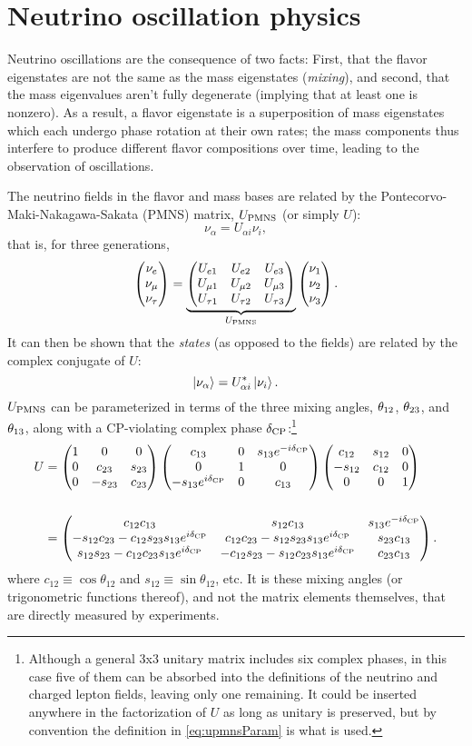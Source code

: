 \documentclass[../thesis.tex]{subfiles}
\begin{document}
\section{Neutrino oscillation physics}
\label{sec:oscPhysics}

Neutrino oscillations are the consequence of two facts: First, that the flavor eigenstates are not the same as the mass eigenstates (\emph{mixing}), and second, that the mass eigenvalues aren't fully degenerate (implying that at least one is nonzero). As a result, a flavor eigenstate is a superposition of mass eigenstates which each undergo phase rotation at their own rates; the mass components thus interfere to produce different flavor compositions over time, leading to the observation of oscillations.

The neutrino fields in the flavor and mass bases are related by the Pontecorvo-Maki-Nakagawa-Sakata (PMNS) matrix, $U_\mathrm{PMNS}$ (or simply $U$):
\begin{equation*}
  \nu_\alpha = U_{\alpha i} \nu_i,
\end{equation*}
that is, for three generations,
\begin{equation*}
  \begin{pmatrix} \nu_e \\ \nu_\mu \\ \nu_\tau \end{pmatrix} = \underbrace{\begin{pmatrix} U_{e 1} & U_{e 2} & U_{e 3} \\ U_{\mu 1} & U_{\mu 2} & U_{\mu 3} \\ U_{\tau 1} & U_{\tau 2} & U_{\tau 3} \end{pmatrix}}_{U_\mathrm{PMNS}} \begin{pmatrix} \nu_1 \\ \nu_2 \\ \nu_3 \end{pmatrix}.
\end{equation*}
It can then be shown that the \emph{states} (as opposed to the fields) are related by the complex conjugate of $U$:
\begin{equation}
  \label{eq:nuStateRel}
  \ket{\nu_\alpha} = U^*_{\alpha i}\ket{\nu_i}.
\end{equation}
$U_\mathrm{PMNS}$ can be parameterized in terms of the three mixing angles, $\theta_{12}$, $\theta_{23}$, and $\theta_{13}$, along with a CP-violating complex phase $\delta_\text{CP}$:\footnote{Although a general 3x3 unitary matrix includes six complex phases, in this case five of them can be absorbed into the definitions of the neutrino and charged lepton fields, leaving only one remaining. It could be inserted anywhere in the factorization of $U$ as long as unitary is preserved, but by convention the definition in \eqref{eq:upmnsParam} is what is used.}
\begin{align}
  \label{eq:upmnsParam}
  \begin{split}
    U &= \begin{pmatrix} 1 & 0 & 0 \\ 0 & c_{23} & s_{23} \\ 0 & -s_{23} & c_{23} \end{pmatrix} \begin{pmatrix} c_{13} & 0 & s_{13}e^{-i\delta_\text{CP}} \\ 0 & 1 & 0 \\ -s_{13}e^{i\delta_\text{CP}} & 0 & c_{13} \end{pmatrix} \begin{pmatrix} c_{12} & s_{12} & 0 \\ -s_{12} & c_{12} & 0 \\ 0 & 0 & 1 \end{pmatrix} \\\\
    &= \begin{pmatrix} c_{12}c_{13} & s_{12} c_{13} & s_{13}e^{-i\delta_\text{CP}} \\ -s_{12}c_{23} - c_{12}s_{23}s_{13}e^{i\delta_\text{CP}} & c_{12}c_{23} - s_{12}s_{23}s_{13}e^{i\delta_\text{CP}} & s_{23}c_{13}\\s_{12}s_{23} - c_{12}c_{23}s_{13}e^{i\delta_\text{CP}} & -c_{12}s_{23} - s_{12}c_{23}s_{13}e^{i\delta_\text{CP}} & c_{23}c_{13} \end{pmatrix}.
  \end{split}
\end{align}
where \(c_{12} \equiv \cos\theta_{12}\) and \(s_{12} \equiv \sin\theta_{12}\), etc. It is these mixing angles (or trigonometric functions thereof), and not the matrix elements themselves, that are directly measured by experiments.
\end{document}

